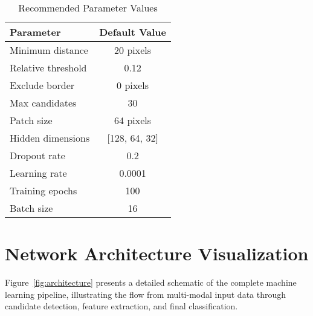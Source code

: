 \documentclass[twocolumn,10pt]{aastex631}
\begin{document}
\begin{table}[h]
\centering
\caption{Recommended Parameter Values}
\begin{tabular}{@{}lc@{}}
\toprule
Parameter & Default Value \\
\midrule
Minimum distance & 20 pixels \\
Relative threshold & 0.12 \\
Exclude border & 0 pixels \\
Max candidates & 30 \\
Patch size & 64 pixels \\
Hidden dimensions & [128, 64, 32] \\
Dropout rate & 0.2 \\
Learning rate & 0.0001 \\
Training epochs & 100 \\
Batch size & 16 \\
\bottomrule
\end{tabular}
\end{table}

\section{Network Architecture Visualization}

Figure~\ref{fig:architecture} presents a detailed schematic of the complete machine learning pipeline, illustrating the flow from multi-modal input data through candidate detection, feature extraction, and final classification.
\end{document}
